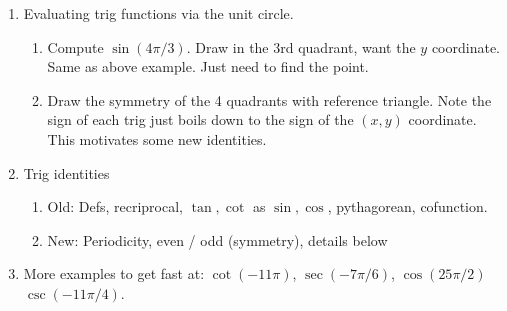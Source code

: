 \documentclass{article}
\begin{document}
\begin{enumerate}

\item Evaluating trig functions via the unit circle.
\begin{enumerate}
\item Compute $\sin(4 \pi/3)$. Draw in the 3rd quadrant, want the $y$ coordinate. Same as above example. Just need to find the point.
\item Draw the symmetry of the 4 quadrants with reference triangle. Note the sign of each trig just boils down to the sign of the $(x,y)$ coordinate. This motivates some new identities.
\end{enumerate}

\item Trig identities
\begin{enumerate}
\item Old: Defs, recriprocal, $\tan, \cot$ as $\sin, \cos$, pythagorean, cofunction.
\item New: Periodicity, even / odd (symmetry), details below
\end{enumerate}

\item More examples to get fast at: $\cot(-11\pi)$, $\sec(-7\pi/6)$, $\cos(25\pi/2)$ $\csc(-11\pi/4)$.


\end{enumerate}
\end{document}

